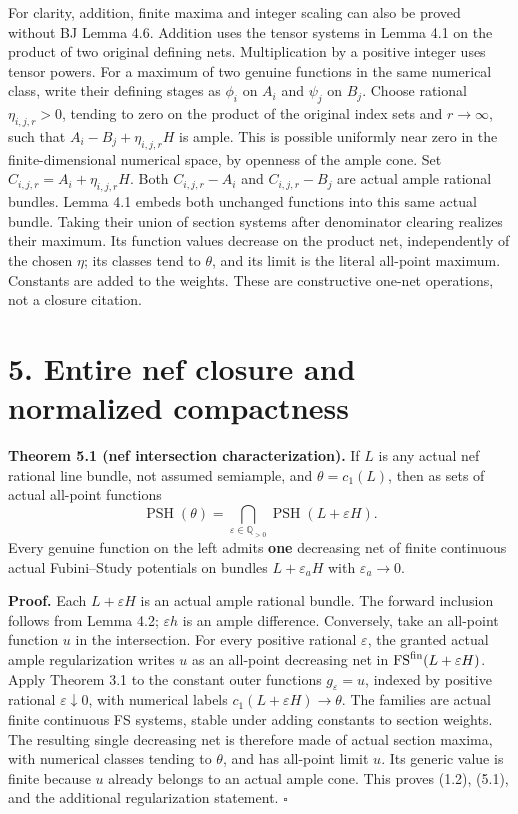 \documentclass[10pt]{article}
\begin{document}
For clarity, addition, finite maxima and integer scaling can also be
proved without BJ Lemma 4.6. Addition uses the tensor systems in Lemma
4.1 on the product of two original defining nets. Multiplication by a
positive integer uses tensor powers. For a maximum of two genuine
functions in the same numerical class, write their defining stages as
\(\phi_i\) on \(A_i\) and \(\psi_j\) on \(B_j\). Choose rational
\(\eta_{i,j,r}>0\), tending to zero on the product of the original index
sets and \(r\to\infty\), such that \(A_i-B_j+\eta_{i,j,r}H\) is ample.
This is possible uniformly near zero in the finite-dimensional numerical
space, by openness of the ample cone. Set
\(C_{i,j,r}=A_i+\eta_{i,j,r}H\). Both \(C_{i,j,r}-A_i\) and
\(C_{i,j,r}-B_j\) are actual ample rational bundles. Lemma 4.1 embeds
both unchanged functions into this same actual bundle. Taking their
union of section systems after denominator clearing realizes their
maximum. Its function values decrease on the product net, independently
of the chosen \(\eta\); its classes tend to \(\theta\), and its limit is
the literal all-point maximum. Constants are added to the weights. These
are constructive one-net operations, not a closure citation.

\section{5. Entire nef closure and normalized
compactness}\label{entire-nef-closure-and-normalized-compactness}

\textbf{Theorem 5.1 (nef intersection characterization).} If \(L\) is
any actual nef rational line bundle, not assumed semiample, and
\(\theta=c_1(L)\), then as sets of actual all-point functions \[
 \operatorname{PSH}(\theta)
 =\bigcap_{\varepsilon\in\mathbb Q_{>0}}
       \operatorname{PSH}(L+\varepsilon H).
 \tag{5.1}
\] Every genuine function on the left admits \textbf{one} decreasing net
of finite continuous actual Fubini--Study potentials on bundles
\(L+\varepsilon_aH\) with \(\varepsilon_a\to0\).

\textbf{Proof.} Each \(L+\varepsilon H\) is an actual ample rational
bundle. The forward inclusion follows from Lemma 4.2; \(\varepsilon h\)
is an ample difference. Conversely, take an all-point function \(u\) in
the intersection. For every positive rational \(\varepsilon\), the
granted actual ample regularization writes \(u\) as an all-point
decreasing net in \(\operatorname{FS}^{\rm fin}(L+\varepsilon H)\).
Apply Theorem 3.1 to the constant outer functions \(g_\varepsilon=u\),
indexed by positive rational \(\varepsilon\downarrow0\), with numerical
labels \(c_1(L+\varepsilon H)\to\theta\). The families are actual finite
continuous FS systems, stable under adding constants to section weights.
The resulting single decreasing net is therefore made of actual section
maxima, with numerical classes tending to \(\theta\), and has all-point
limit \(u\). Its generic value is finite because \(u\) already belongs
to an actual ample cone. This proves (1.2), (5.1), and the additional
regularization statement. \(\square\)
\end{document}

